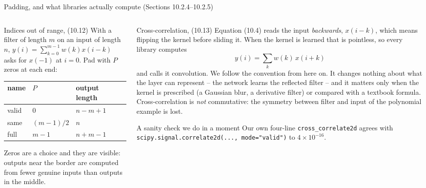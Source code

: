 \documentclass[10pt,aspectratio=169]{beamer}
\begin{document}
\begin{frame}{Padding, and what libraries actually compute (Sections 10.2.4--10.2.5)}
\small
\begin{columns}[T]
\begin{column}{0.5\textwidth}
\begin{block}{Indices out of range, (10.12)}
\scriptsize
With a filter of length $m$ on an input of length $n$,
$y(i)=\sum_{k=0}^{m-1}w(k)x(i-k)$ asks for $x(-1)$ at $i=0$.  Pad with $P$
zeros at each end:
\begin{center}
\begin{tabular}{@{}lll@{}}
\toprule
name & $P$ & output length\\
\midrule
valid & $0$ & $n-m+1$\\
same & $(m-1)/2$ & $n$\\
full & $m-1$ & $n+m-1$\\
\bottomrule
\end{tabular}
\end{center}
Zeros are a choice and they are visible: outputs near the border are
computed from fewer genuine inputs than outputs in the middle.
\end{block}
\end{column}
\begin{column}{0.48\textwidth}
\begin{block}{Cross-correlation, (10.13)}
\scriptsize
Equation (10.4) reads the input \emph{backwards}, $x(i-k)$, which means
flipping the kernel before sliding it.  When the kernel is learned that is
pointless, so every library computes
\[
  y(i)=\sum_k w(k)\,x(i+k)
\]
and calls it convolution.  We follow the convention from here on.  It
changes nothing about what the layer can represent -- the network learns
the reflected filter -- and it matters only when the kernel is prescribed
(a Gaussian blur, a derivative filter) or compared with a textbook formula.
Cross-correlation is \emph{not} commutative: the symmetry between filter
and input of the polynomial example is lost.
\end{block}
\begin{block}{A sanity check we do in a moment}
\scriptsize
Our own four-line \texttt{cross\_correlate2d} agrees with
\texttt{scipy.signal.correlate2d(..., mode="valid")} to $4\times10^{-16}$.
\end{block}
\end{column}
\end{columns}
\end{frame}
\end{document}
